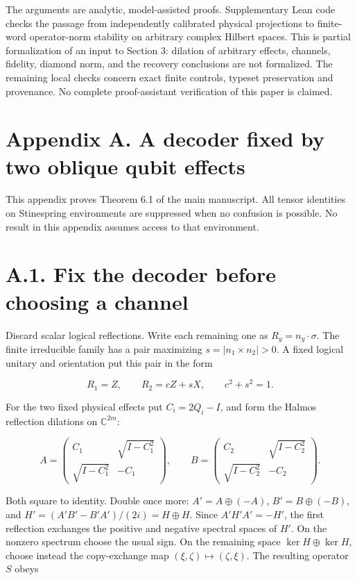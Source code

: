 \documentclass[11pt]{article}
\begin{document}
The arguments are analytic, model-assisted proofs. Supplementary Lean code
checks the passage from independently calibrated physical projections to
finite-word operator-norm stability on arbitrary complex Hilbert spaces.
This is partial formalization of an input to Section 3: dilation of arbitrary
effects, channels, fidelity, diamond norm, and the recovery conclusions are
not formalized. The remaining local checks concern exact finite controls,
typeset preservation and provenance. No complete proof-assistant verification
of this paper is claimed.

\clearpage\section*{Appendix A. A decoder fixed by two oblique qubit effects}

This appendix proves Theorem 6.1 of the main manuscript. All tensor identities
on Stinespring environments are suppressed when no confusion is possible.
No result in this appendix assumes access to that environment.

\section*{A.1. Fix the decoder before choosing a channel}

Discard scalar logical reflections. Write each remaining one as
\(R_y=n_y\cdot\sigma\). The finite irreducible family has a pair maximizing
\(s=|n_1\times n_2|>0\). A fixed logical unitary and orientation put this
pair in the form

\[
R_1=Z,\qquad R_2=cZ+sX,\qquad c^2+s^2=1.
\tag{A.1}
\]

For the two fixed physical effects put \(C_i=2Q_i-I\), and form the
Halmos reflection dilations on \(\mathbb C^{2m}\):

\[
A=\begin{pmatrix}C_1&\sqrt{I-C_1^2}\\
\sqrt{I-C_1^2}&-C_1\end{pmatrix},\qquad
B=\begin{pmatrix}C_2&\sqrt{I-C_2^2}\\
\sqrt{I-C_2^2}&-C_2\end{pmatrix}.
\tag{A.2}
\]

Both square to identity. Double once more:
\(A'=A\oplus(-A)\), \(B'=B\oplus(-B)\), and
\(H'=(A'B'-B'A')/(2i)=H\oplus H\). Since
\(A'H'A'=-H'\), the first reflection exchanges the positive and negative
spectral spaces of \(H'\). On the nonzero spectrum choose the usual sign.
On the remaining space \(\ker H\oplus\ker H\), choose instead the
copy-exchange map \((\xi,\zeta)\mapsto(\zeta,\xi)\). The resulting
operator \(S\) obeys
\end{document}
